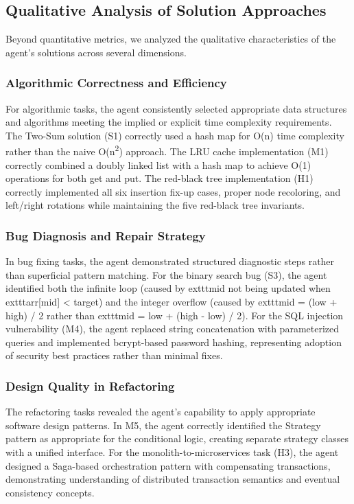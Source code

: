 \documentclass[conference]{IEEEtran}
\begin{document}
\subsection{Qualitative Analysis of Solution Approaches}

Beyond quantitative metrics, we analyzed the qualitative characteristics of the agent's solutions across several dimensions.

\subsubsection{Algorithmic Correctness and Efficiency}

For algorithmic tasks, the agent consistently selected appropriate data structures and algorithms meeting the implied or explicit time complexity requirements. The Two-Sum solution (S1) correctly used a hash map for O(n) time complexity rather than the naive O(n\textsuperscript{2}) approach. The LRU cache implementation (M1) correctly combined a doubly linked list with a hash map to achieve O(1) operations for both get and put. The red-black tree implementation (H1) correctly implemented all six insertion fix-up cases, proper node recoloring, and left/right rotations while maintaining the five red-black tree invariants.

\subsubsection{Bug Diagnosis and Repair Strategy}

In bug fixing tasks, the agent demonstrated structured diagnostic steps rather than superficial pattern matching. For the binary search bug (S3), the agent identified both the infinite loop (caused by 			exttt{mid} not being updated when 			exttt{arr[mid] < target}) and the integer overflow (caused by 			exttt{mid = (low + high) / 2} rather than 			exttt{mid = low + (high - low) / 2}). For the SQL injection vulnerability (M4), the agent replaced string concatenation with parameterized queries and implemented bcrypt-based password hashing, representing adoption of security best practices rather than minimal fixes.

\subsubsection{Design Quality in Refactoring}

The refactoring tasks revealed the agent's capability to apply appropriate software design patterns. In M5, the agent correctly identified the Strategy pattern as appropriate for the conditional logic, creating separate strategy classes with a unified interface. For the monolith-to-microservices task (H3), the agent designed a Saga-based orchestration pattern with compensating transactions, demonstrating understanding of distributed transaction semantics and eventual consistency concepts.
\end{document}
